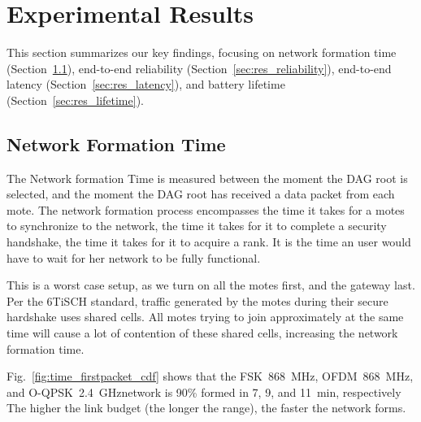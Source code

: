 \documentclass[sensors,article,submit,moreauthors,pdftex]{Definitions/mdpi}
\newcommand{\fsk}           {FSK~868~MHz}
\newcommand{\oqpsk}         {O-QPSK~2.4~GHz}
\newcommand{\ofdm}          {OFDM~868~MHz}
\begin{document}
\section{Experimental Results}
\label{sec:results}

This section summarizes our key findings, focusing on
    network formation time (Section~\ref{sec:res_formation}),
    end-to-end reliability (Section~\ref{sec:res_reliability}),
    end-to-end latency (Section~\ref{sec:res_latency}), and
    battery lifetime (Section~\ref{sec:res_lifetime}).

\subsection{Network Formation Time}
\label{sec:res_formation}


The Network formation Time is measured between the moment the DAG root is selected, and the moment the DAG root has received a data packet from each mote.
The network formation process encompasses
    the time it takes for a motes to synchronize to the network,
    the time it takes for it to complete a security handshake,
    the time it takes for it to acquire a rank.
It is the time an user would have to wait for her network to be fully functional.


This is a worst case setup, as we turn on all the motes first, and the gateway last.
Per the 6TiSCH standard, traffic generated by the motes during their secure hardshake uses shared cells.
All motes trying to join approximately at the same time will cause a lot of contention of these shared cells, increasing the network formation time.


Fig.~\ref{fig:time_firstpacket_cdf} shows that the \fsk, \ofdm , and \oqpsk network is 90\% formed in 7, 9, and 11~min, respectively
The higher the link budget (the longer the range), the faster the network forms.
\end{document}

